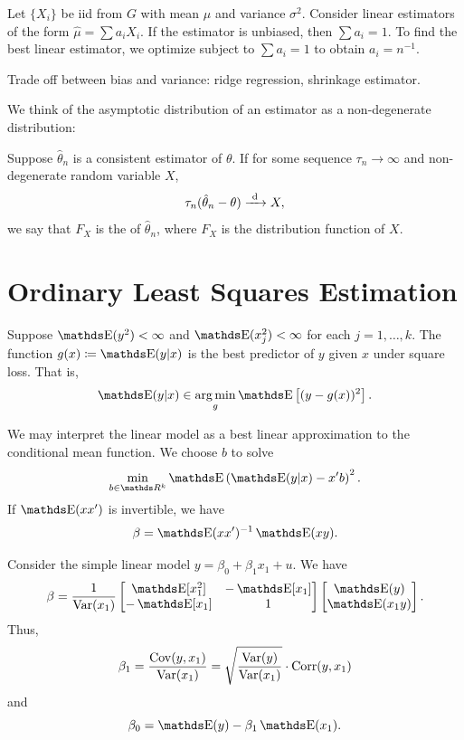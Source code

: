 \documentclass[letterpaper, 10pt]{article}
\begin{document}
\begin{example}
  Let \(\{X_i\}\) be iid from \(G\) with mean \(\mu\) and variance \(\sigma^2\).
  Consider linear estimators of the form \(\hat{\mu} = \sum a_i X_i\).
  If the estimator is unbiased, then \(\sum a_i = 1\).
  To find the best linear estimator, we optimize subject to \(\sum a_i = 1\) to obtain \(a_i = n^{-1}\).
\end{example}

\begin{remark}
  Trade off between bias and variance: ridge regression, shrinkage estimator.
\end{remark}


We think of the asymptotic distribution of an estimator as a non-degenerate distribution:
\begin{definition}
  Suppose \(\hat{\theta}_n\) is a consistent estimator of \(\theta\).
  If for some sequence \(\tau_n \to \infty\) and non-degenerate random variable \(X\),
  \[
    \tau_n (\hat{\theta}_n - \theta) \xrightarrow{\ \mathrm{d}\ } X,
  \]
  we say that \(F_X\) is the  of \(\hat{\theta}_n\), where \(F_X\) is the distribution function of \(X\).
\end{definition}




\section{Ordinary Least Squares Estimation}
\begin{theorem}
  Suppose \(\E(y^2) < \infty\) and \(\E(x_j^2) < \infty\) for each \(j = 1, \dots, k\).
  The function \(g(x) \coloneqq \E(y|x)\) is the best predictor of \(y\) given \(x\) under square loss.
  That is,
  \[
    \E(y|x) \in \argmin_{g} \E\left[ (y - g(x))^2 \right] .
  \]
\end{theorem}

We may interpret the linear model as a best linear approximation to the conditional mean function.
We choose \(b\) to solve
\[
  \min_{b \in \RR^k} \E\left( \E(y|x) - x' b \right)^2.
\]
If \(\E(xx')\) is invertible, we have
\[
  \beta = \E(xx')^{-1} \E(xy).
\]

\begin{example}
  Consider the simple linear model \(y = \beta_0 + \beta_1 x_1 + u\).
  We have
  \[
    \beta
    = \frac{1}{\Var(x_1)} \bmat{
      \E[x_1^2] & -\E[x_1] \\
      -\E[x_1] & 1
    } \bmat{
      \E(y) \\
      \E(x_1 y)
    }.
  \]
  Thus,
  \[
    \beta_1
    = \frac{\operatorname{Cov}(y, x_1)}{\operatorname{Var}(x_1)}
    = \sqrt{\frac{\operatorname{Var}(y)}{\operatorname{Var}(x_1)}} \cdot \operatorname{Corr}(y, x_1)
  \]
  and
  \[
    \beta_0 = \E(y) - \beta_1 \E(x_1).
  \]
\end{example}
\end{document}
